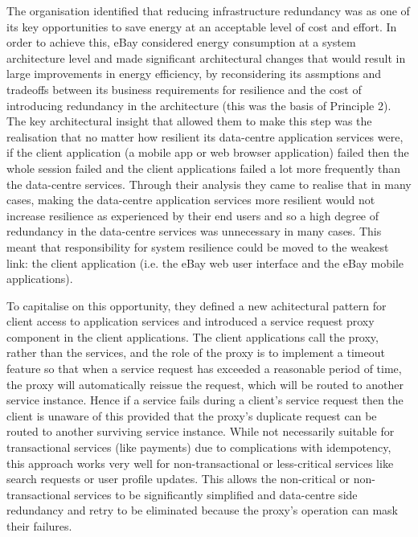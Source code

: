 The organisation identified that reducing infrastructure redundancy was as one of its key opportunities to save energy at an acceptable level of cost and effort. In order to achieve this, eBay considered energy consumption at a system architecture level and made significant architectural changes that would result in large improvements in energy efficiency, by reconsidering its assmptions and tradeoffs between its business requirements for resilience and the cost of introducing redundancy in the architecture (this was the basis of Principle 2).  The key architectural insight that allowed them to make this step was the realisation that no matter how resilient its data-centre application services were, if the client application (a mobile app or web browser application) failed then the whole session failed and the client applications failed a lot more frequently than the data-centre services.  Through their analysis they came to realise that in many cases, making the data-centre application services more resilient would not increase resilience as experienced by their end users and so a high degree of redundancy in the data-centre services was unnecessary in many cases. This meant that responsibility for system resilience could be moved to the weakest link: the client application (i.e. the eBay web user interface and the eBay mobile applications).

To capitalise on this opportunity, they defined a new achitectural pattern for client access to application services and introduced a service request proxy component in the client applications. The client applications call the proxy, rather than the services, and the role of the proxy is to implement a timeout feature so that when a service request has exceeded a reasonable period of time, the proxy will automatically reissue the request, which will be routed to another service instance.  Hence if a service fails during a client's service request then the client is unaware of this provided that the proxy's duplicate request can be routed to another surviving service instance.  While not necessarily suitable for transactional services (like payments) due to complications with idempotency, this approach works very well for non-transactional or less-critical services like search requests or user profile updates.  This allows the non-critical or non-transactional services to be significantly simplified and data-centre side redundancy and retry to be eliminated because the proxy's operation can mask their failures.

